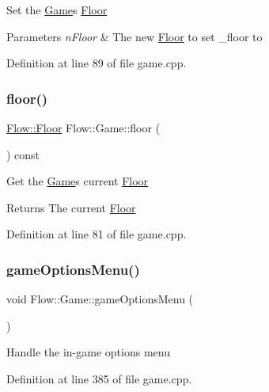Set the \hyperlink{class_flow_1_1_game}{Game}\textquotesingle{}s \hyperlink{class_flow_1_1_floor}{Floor} 
\begin{DoxyParams}{Parameters}
{\em n\+Floor} & The new \hyperlink{class_flow_1_1_floor}{Floor} to set \+\_\+floor to \\
\hline
\end{DoxyParams}


Definition at line 89 of file game.\+cpp.

\hypertarget{class_flow_1_1_game_a9b18f73128d214e1774b75ce05d63039}{}\label{class_flow_1_1_game_a9b18f73128d214e1774b75ce05d63039} 
\subsubsection{\texorpdfstring{floor()}{floor()}\hspace{0.1cm}{\footnotesize\ttfamily [2/2]}}
{\footnotesize\ttfamily \hyperlink{class_flow_1_1_floor}{Flow\+::\+Floor} Flow\+::\+Game\+::floor (\begin{DoxyParamCaption}{ }\end{DoxyParamCaption}) const}

Get the \hyperlink{class_flow_1_1_game}{Game}\textquotesingle{}s current \hyperlink{class_flow_1_1_floor}{Floor} \begin{DoxyReturn}{Returns}
The current \hyperlink{class_flow_1_1_floor}{Floor} 
\end{DoxyReturn}


Definition at line 81 of file game.\+cpp.

\hypertarget{class_flow_1_1_game_a55e2c12a46497c5d0f8bafca7f5cc808}{}\label{class_flow_1_1_game_a55e2c12a46497c5d0f8bafca7f5cc808} 
\subsubsection{\texorpdfstring{game\+Options\+Menu()}{gameOptionsMenu()}}
{\footnotesize\ttfamily void Flow\+::\+Game\+::game\+Options\+Menu (\begin{DoxyParamCaption}{ }\end{DoxyParamCaption})}

Handle the in-\/game options menu 

Definition at line 385 of file game.\+cpp.

